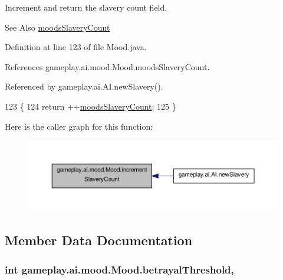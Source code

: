 Increment and return the slavery count field. 

\begin{DoxySeeAlso}{See Also}
\hyperlink{classgameplay_1_1ai_1_1mood_1_1_mood_a0bfc4bebdf6767b8c32e747ec21da39e}{moods\-Slavery\-Count} 
\end{DoxySeeAlso}


Definition at line 123 of file Mood.\-java.



References gameplay.\-ai.\-mood.\-Mood.\-moods\-Slavery\-Count.



Referenced by gameplay.\-ai.\-A\-I.\-new\-Slavery().


\begin{DoxyCode}
123                                        \{
124         \textcolor{keywordflow}{return} ++\hyperlink{classgameplay_1_1ai_1_1mood_1_1_mood_a0bfc4bebdf6767b8c32e747ec21da39e}{moodsSlaveryCount};
125     \}
\end{DoxyCode}


Here is the caller graph for this function\-:
\nopagebreak
\begin{figure}[H]
\begin{center}
\leavevmode
\includegraphics[width=350pt]{classgameplay_1_1ai_1_1mood_1_1_mood_ac416312a82ad5afce4090858b47b0c96_icgraph}
\end{center}
\end{figure}




\subsection{Member Data Documentation}
\hypertarget{classgameplay_1_1ai_1_1mood_1_1_mood_af8ba28f8a5e568f223c07e0acb788be9}{
\subsubsection[{betrayal\-Threshold}]{\setlength{\rightskip}{0pt plus 5cm}int gameplay.\-ai.\-mood.\-Mood.\-betrayal\-Threshold\hspace{0.3cm}{\ttfamily [protected]}, {\ttfamily [inherited]}}}\label{classgameplay_1_1ai_1_1mood_1_1_mood_af8ba28f8a5e568f223c07e0acb788be9}


